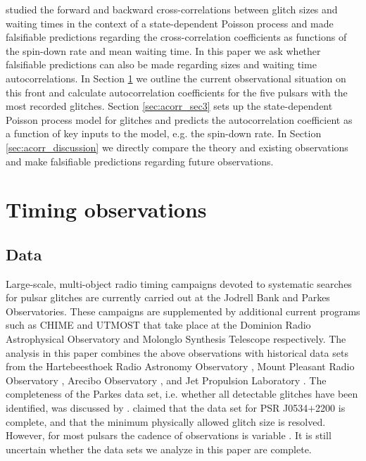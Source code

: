 \citet{Melatos2018} studied the forward and backward cross-correlations between glitch sizes and waiting times in the context of a state-dependent Poisson process \citep{Daly2007, Wheatland2008, Fulgenzi2017} and made falsifiable predictions regarding the cross-correlation coefficients as functions of the spin-down rate and mean waiting time. In this paper we ask whether falsifiable predictions can also be made regarding sizes and waiting time autocorrelations. In Section \ref{sec:acorr_obs} we outline the current observational situation on this front and calculate autocorrelation coefficients for the five pulsars with the most recorded glitches. Section \ref{sec:acorr_sec3} sets up the state-dependent Poisson process model for glitches and predicts the autocorrelation coefficient as a function of key inputs to the model, e.g. the spin-down rate. In Section \ref{sec:acorr_discussion} we directly compare the theory and existing observations and make falsifiable predictions regarding future observations.

\section{Timing observations}
\label{sec:acorr_obs}
\subsection{Data}
Large-scale, multi-object radio timing campaigns devoted to systematic searches for pulsar glitches are currently carried out at the Jodrell Bank \citep{Espinoza2011} and Parkes \citep{Yu2013, Yu2017b} Observatories. These campaigns are supplemented by additional current programs such as CHIME \citep{Ng2018} and UTMOST \citep{Jankowski2019} that take place at the Dominion Radio Astrophysical Observatory and Molonglo Synthesis Telescope respectively. The analysis in this paper combines the above observations with historical data sets from the Hartebeesthoek Radio Astronomy Observatory \citep{Buchner2008}, Mount Pleasant Radio Observatory \citep{Palfreyman2016}, Arecibo Observatory \citep{Arzoumanian2018}, and Jet Propulsion Laboratory \citep{Downs1981}. The completeness of the Parkes data set, i.e. whether all detectable glitches have been identified, was discussed by \citet{Yu2017b}. \citet{Espinoza2014} claimed that the data set for PSR J0534$+$2200 is complete, and that the minimum physically allowed glitch size is resolved. However, for most pulsars the cadence of observations is variable \citep{Janssen2006, Yu2017b}. It is still uncertain whether the data sets we analyze in this paper are complete. 

